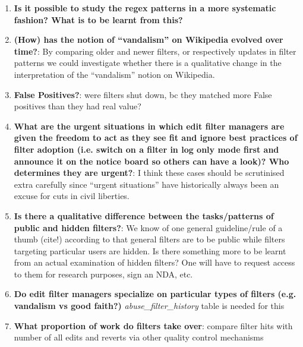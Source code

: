 \begin{enumerate}
    \item \textbf{Is it possible to study the regex patterns in a more systematic fashion? What is to be learnt from this?}%
    \item \textbf{(How) has the notion of ``vandalism'' on Wikipedia evolved over time?}: By comparing older and newer filters, or respectively updates in filter patterns we could investigate whether there is a qualitative change in the interpretation of the ``vandalism'' notion on Wikipedia.
    \item \textbf{False Positives?}: were filters shut down, bc they matched more False positives than they had real value?
    \item \textbf{What are the urgent situations in which edit filter managers are given the freedom to act as they see fit and ignore best practices of filter adoption (i.e. switch on a filter in log only mode first and announce it on the notice board so others can have a look)? Who determines they are urgent?}: I think these cases should be scrutinised extra carefully since ``urgent situations'' have historically always been an excuse for cuts in civil liberties.
    \item \textbf{Is there a qualitative difference between the tasks/patterns of public and hidden filters?}: We know of one general guideline/rule of a thumb (cite!) according to that general filters are to be public while filters targeting particular users are hidden. Is there something more to be learnt from an actual examination of hidden filters? One will have to request access to them for research purposes, sign an NDA, etc.
    \item \textbf{Do edit filter managers specialize on particular types of filters (e.g. vandalism vs good faith?)} \emph{abuse\_filter\_history } table is needed for this
    \item \textbf{What proportion of work do filters take over}: compare filter hits with number of all edits and reverts via other quality control mechanisms
\end{enumerate}
